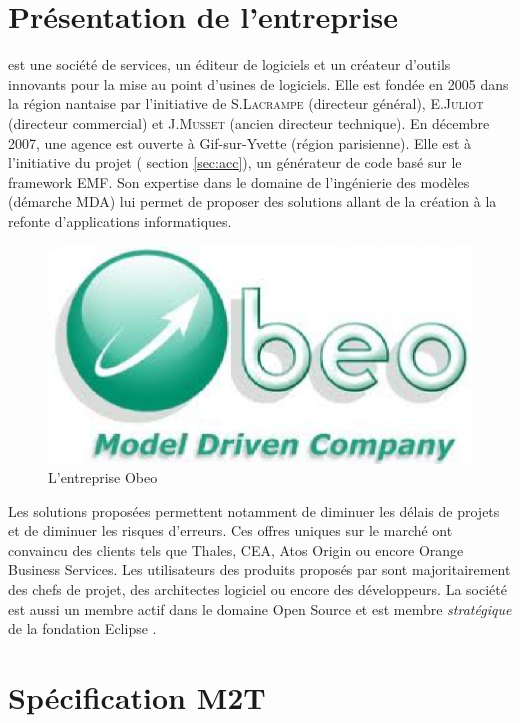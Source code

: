 \section{Présentation de l'entreprise}
\kwobeo{} est une société de services, un éditeur de logiciels et un créateur d'outils innovants pour la mise au point d'usines de logiciels\cite{obeo}.  Elle est fondée en 2005 dans la région nantaise par l'initiative de S.\textsc{Lacrampe} (directeur général), E.\textsc{Juliot} (directeur commercial) et J.\textsc{Musset} (ancien directeur technique). En décembre 2007, une agence est ouverte à Gif-sur-Yvette (région parisienne). Elle est à l'initiative du projet \kwacceleo{} (\cf{} section \ref{sec:acc}), un générateur de code basé sur le framework EMF. Son expertise dans le domaine de l'ingénierie des modèles (démarche MDA) lui permet de proposer des solutions allant de la création à la refonte d'applications informatiques. 
\begin{figure}[htb]
  \centering
  \includegraphics[scale=.45]{img/logoobeo.eps}
  \caption{L'entreprise Obeo}
\end{figure}


Les solutions proposées permettent notamment de diminuer les délais de projets et de diminuer les risques d'erreurs. Ces offres uniques sur le marché ont convaincu des clients tels que Thales, CEA, Atos Origin ou encore Orange Business Services. Les utilisateurs des produits proposés par \kwobeo sont majoritairement des chefs de projet, des architectes logiciel ou encore des développeurs.
La société \kwobeo{} est aussi un membre actif dans le domaine Open Source et est membre \emph{stratégique} de la fondation Eclipse \cite{fondation}.

\clearpage

\section{Spécification M2T}\label{sec:m2t}

